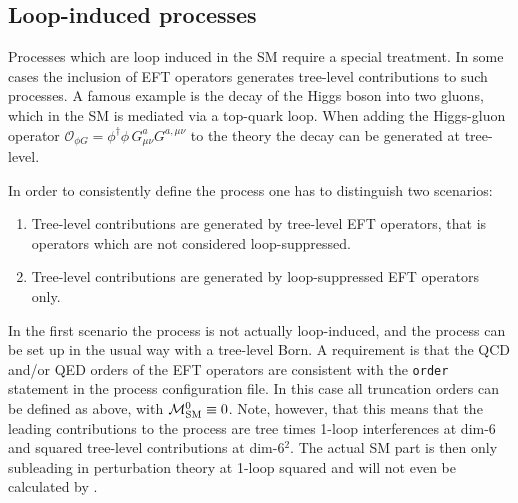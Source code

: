 \subsection{Loop-induced processes}\label{sec:loop-induced}
Processes which are loop induced in the SM require a special treatment. In some cases the inclusion of EFT operators generates tree-level contributions to such processes. A famous example is the decay of the Higgs boson into two gluons, which in the SM is mediated via a top-quark loop. When adding the Higgs-gluon operator $\mathcal{O}_{\phi G} = \phi^\dagger\phi\,G^a_{\mu\nu}G^{a,\mu\nu}$ to the theory the decay can be generated at tree-level.

In order to consistently define the process one has to distinguish two scenarios:
\begin{enumerate}
   \item Tree-level contributions are generated by tree-level EFT operators, that is operators which are not considered loop-suppressed.
   \item Tree-level contributions are generated by loop-suppressed EFT operators only.
\end{enumerate}
In the first scenario the process is not actually loop-induced, and the process can be set up in the usual way with a tree-level Born. A requirement is that the QCD and/or QED orders of the EFT operators are consistent with the \texttt{order} statement in the process configuration file. In this case all truncation orders can be defined as above, with $\mathcal{M}_\mathrm{SM}^0\equiv0$. Note, however, that this means that the leading contributions to the process are tree times 1-loop interferences at dim-6 and squared tree-level contributions at dim-6$^2$. The actual SM part is then only subleading in perturbation theory at 1-loop squared and will not even be calculated by \gosam. 

